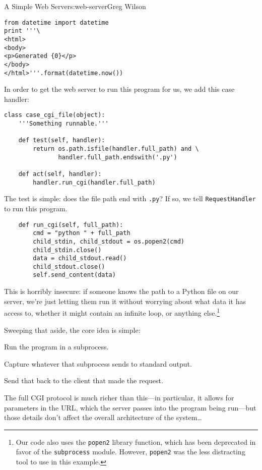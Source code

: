 \begin{aosachapter}{A Simple Web Server}{s:web-server}{Greg Wilson}
\begin{verbatim}
from datetime import datetime
print '''\
<html>
<body>
<p>Generated {0}</p>
</body>
</html>'''.format(datetime.now())
\end{verbatim}

In order to get the web server to run this program for us, we add this
case handler:

\begin{verbatim}
class case_cgi_file(object):
    '''Something runnable.'''

    def test(self, handler):
        return os.path.isfile(handler.full_path) and \
               handler.full_path.endswith('.py')

    def act(self, handler):
        handler.run_cgi(handler.full_path)
\end{verbatim}

The test is simple: does the file path end with \texttt{.py}? If so, we
tell \texttt{RequestHandler} to run this program.

\begin{verbatim}
    def run_cgi(self, full_path):
        cmd = "python " + full_path
        child_stdin, child_stdout = os.popen2(cmd)
        child_stdin.close()
        data = child_stdout.read()
        child_stdout.close()
        self.send_content(data)
\end{verbatim}

This is horribly insecure: if someone knows the path to a Python file on
our server, we're just letting them run it without worrying about what
data it has access to, whether it might contain an infinite loop, or
anything else.\footnote{Our code also uses the \texttt{popen2} library
  function, which has been deprecated in favor of the
  \texttt{subprocess} module. However, \texttt{popen2} was the less
  distracting tool to use in this example.}

Sweeping that aside, the core idea is simple:

\begin{aosaenumerate}
\def\labelenumi{\arabic{enumi}.}

\item
  Run the program in a subprocess.
\item
  Capture whatever that subprocess sends to standard output.
\item
  Send that back to the client that made the request.
\end{aosaenumerate}

The full CGI protocol is much richer than this---in particular, it
allows for parameters in the URL, which the server passes into the
program being run---but those details don't affect the overall
architecture of the system\ldots{}


\end{aosachapter}
